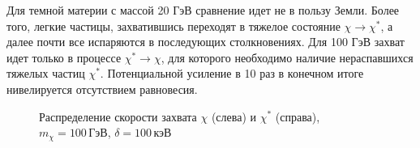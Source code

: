Для темной материи с массой 20 ГэВ сравнение идет не в пользу Земли. Более того, легкие частицы, захватившись переходят в тяжелое состояние $\chi \rightarrow \chi^*$, а далее почти все испаряются в последующих столкновениях. Для 100 ГэВ захват идет только в процессе  $\chi^* \rightarrow \chi$, для которого необходимо наличие нераспавшихся тяжелых частиц $\chi^*$. Потенциальной усиление в 10 раз в конечном итоге нивелируется отсутствием равновесия.


\begin{figure}[!h]
\caption{ Распределение скорости захвата $\chi$ (слева) и $\chi^*$ (справа), $m_{\chi} = 100 \, \text{ГэВ}$, $\delta = 100 \, \text{кэВ}$}
\label{plot:C_L_100_100}
\end{figure}

